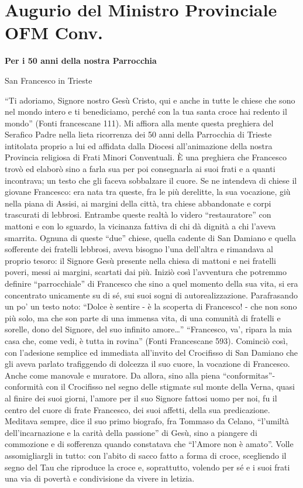 \chapter*{Augurio del Ministro Provinciale\\ OFM Conv.}
\begin{center}
\bfseries
	Per i 50 anni della nostra Parrocchia\par San Francesco in Trieste
\end{center}
``Ti adoriamo, Signore nostro Gesù Cristo, qui e anche in tutte le chiese che sono nel mondo 
intero e ti benediciamo, perché con la tua santa croce hai redento il mondo” (Fonti francescane 
111). Mi affiora alla mente questa preghiera del Serafico Padre nella lieta ricorrenza dei 50 anni 
della Parrocchia di Trieste intitolata proprio a lui ed affidata dalla Diocesi all’animazione della 
nostra Provincia religiosa di Frati Minori Conventuali. È una preghiera che Francesco trovò ed 
elaborò sino a farla sua per poi consegnarla ai suoi frati e a quanti incontrava; un testo che gli 
faceva sobbalzare il cuore. Se ne intendeva di chiese il giovane Francesco: era nata tra queste, fra le 
più derelitte, la sua vocazione, giù nella piana di Assisi, ai margini della città, tra chiese 
abbandonate e corpi trascurati di lebbrosi. Entrambe queste realtà lo videro “restauratore” con 
mattoni e con lo sguardo, la vicinanza fattiva di chi dà dignità a chi l’aveva smarrita. Ognuna di 
queste “due” chiese, quella cadente di San Damiano e quella sofferente dei fratelli lebbrosi, aveva 
bisogno l’una dell’altra e rimandava al proprio tesoro: il Signore Gesù presente nella chiesa di 
mattoni e nei fratelli poveri, messi ai margini, scartati dai più. Iniziò così l’avventura che potremmo 
definire ``parrocchiale'' di Francesco che sino a quel momento della sua vita, si era concentrato 
unicamente su di sé, sui suoi sogni di autorealizzazione. Parafrasando un po' un testo noto: ``Dolce è 
sentire - è la scoperta di Francesco! - che non sono più solo, ma che son parte di una immensa vita, 
di una comunità di fratelli e sorelle, dono del Signore, del suo infinito amore…''
\bigbreak
``Francesco, va’, ripara la mia casa che, come vedi, è tutta in rovina'' (Fonti Francescane 
593). Cominciò così, con l’adesione semplice ed immediata all’invito del Crocifisso di San 
Damiano che gli aveva parlato trafiggendo di dolcezza il suo cuore, la vocazione di Francesco. 
Anche come manovale e muratore. Da allora, sino alla piena “conformitas”- conformità con il 
Crocifisso nel segno delle stigmate sul monte della Verna, quasi al finire dei suoi giorni, l’amore 
per il suo Signore fattosi uomo per noi, fu il centro del cuore di frate Francesco, dei suoi affetti, 
della sua predicazione. Meditava sempre, dice il suo primo biografo, fra Tommaso da Celano, 
“l’umiltà dell’incarnazione e la carità della passione” di Gesù, sino a piangere di commozione e di 
sofferenza quando constatava che “l’Amore non è amato”. Volle assomigliargli in tutto: con l’abito 
di sacco fatto a forma di croce, scegliendo il segno del Tau che riproduce la croce e, soprattutto, 
volendo per sé e i suoi frati una via di povertà e condivisione da vivere in letizia.

